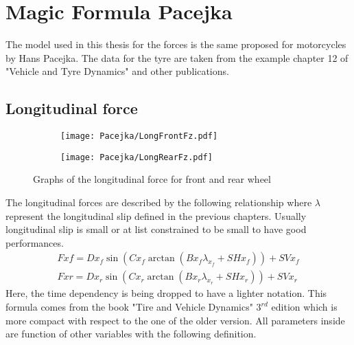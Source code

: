 \chapter{Magic Formula Pacejka}
\label{Ch:MagicFormula}
%
The model used in this thesis for the forces is the same proposed for motorcycles by Hans Pacejka.\cite{pacejka2012tire} The data for the tyre are taken from the example chapter 12 of "Vehicle and Tyre Dynamics" and other publications.\cite{sharp2004advances,sharp2014method}
%
\section{Longitudinal force}
%
\begin{figure}%
    \begin{subfigure}{.5\linewidth}
        \texttt{[image: Pacejka/LongFrontFz.pdf]}
        \caption{}
        \label{fig:long1a}
    \end{subfigure}%
    \begin{subfigure}{.5\linewidth}
        \texttt{[image: Pacejka/LongRearFz.pdf]}
        \caption{}
        \label{fig:long1b}
    \end{subfigure}
    \caption{Graphs of the longitudinal force for front and rear wheel}
\end{figure}
%
%
The longitudinal forces are described by the following relationship where $\lambda$ represent the longitudinal slip defined in the previous chapters. Usually longitudinal slip is small or at list constrained to be small to have good performances.
%
\begin{equation}
    \begin{array}{l}
        Fxf = Dx_f  \sin( Cx_f  \arctan(Bx_f  \lambda_{x_f} + SHx_f  ) ) + SVx_f\\
        Fxr = Dx_r  \sin( Cx_r  \arctan(Bx_r  \lambda_{x_r} + SHx_r  ) ) + SVx_r
    \end{array}
\end{equation}
%
Here, the time dependency is being dropped to have a lighter notation. This formula comes from the book "Tire and Vehicle Dynamics" $3^{rd}$ edition\cite{pacejka2012tire} which is more compact with respect to the one of the older version\cite{pacejka2006tyre}.
All parameters inside are function of other variables with the following definition.
%
